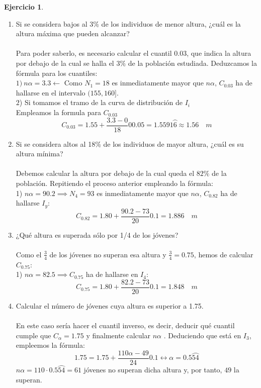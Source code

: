 \documentclass[a4paper, 12pt]{article}
\theoremstyle{definition}
\newtheorem{ej}{Ejercicio}
\begin{document}
\begin{ej}
\begin{enumerate}[label=\textit{\alph*)}]
    \item Si se considera bajos al 3\% de los individuos de menor altura, ¿cuál es la altura máxima que pueden alcanzar?
    \\\\
    Para poder saberlo, es necesario calcular el cuantil $0.03$, que indica la altura por debajo de la cual se halla el $3\%$ de la población estudiada. Deduzcamos la fórmula para los cuantiles:
  \\ 
  $1) \ n\alpha = 3.3 \leftarrow$ Como $N_{1} = 18$ es inmediatamente mayor que $n\alpha$, $C_{0.03}$ ha de hallarse en el intervalo $(155,160]$. \\
    $2$) Si tomamos el tramo de la curva de distribución de $I_{i}$ 
    \\
    Empleamos la formula para $C_{0.03}$ 
    $$C_{0.03} = 1.55 + \frac{3.3 - 0}{18}0 0.05 = 1.5591\wideparen{6} \approx 1.56\quad m$$
    \item Si se considera altos al 18\% de los individuos de mayor altura, ¿cuál es su altura mínima? \\\\
    Debemos calcular la altura por debajo de la cual queda el $82\%$ de la población. Repitiendo el proceso anterior empleando la fórmula: 
    \\
    1) $n\alpha=90.2 \implies N_{4} = 93$ es inmediatamente mayor que $n\alpha$, $C_{0.82}$ ha de hallarse $I_{y}$:
    $$C_{0.82} = 1.80 + \frac{90.2 - 73}{20}0.1 = 1.886\quad m$$
    \item ¿Qué altura es superada sólo por 1/4 de los jóvenes? \\\\
    Como el $\frac{3}{4}$ de los jóvenes no superan esa altura y $\frac{3}{4}=0.75$, hemos de calcular $C_{0.75}$:
    \\
    1) $n\alpha = 82.5 \implies C_{0.75}$ ha de hallarse en $I_{4}$:
    $$C_{0.75} = 1.80 + \frac{82.2 - 73}{20}0.1 = 1.848\quad m$$
    \item Calcular el número de jóvenes cuya altura es superior a 1.75. \\\\
    En este caso sería hacer el cuantil inverso, es decir, deducir qué cuantil cumple que $C_{\alpha} = 1.75$ y finalmente calcular $n\alpha$ . Deduciendo que está en $I_{3}$, empleemos la fórmula:
    $$1.75 = 1.75 + \frac{110\alpha - 49}{24}0.1 \longleftrightarrow \alpha = 0.5\wideparen{54}$$
    $n\alpha = 110 \cdot 0.5\wideparen{54} = 61$ jóvenes no superan dicha altura y, por tanto, $49$ la superan. \\

\end{enumerate}
\end{ej}
\end{document}
